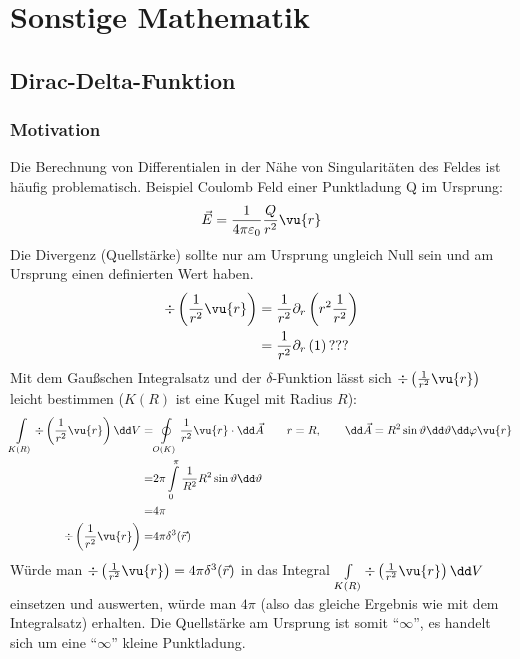 \chapter{Sonstige Mathematik}
 \section{Dirac-Delta-Funktion}
  \subsection{Motivation}
	  Die Berechnung von Differentialen in der Nähe von Singularitäten des Feldes
	  ist häufig problematisch. Beispiel Coulomb Feld einer Punktladung Q im Ursprung:
	  \begin{equation}
		  \begin{split}
			  \vec{E}= \frac{1}{4\pi\varepsilon_{0}}\frac{Q}{r^{2}}\vu{r}
		  \end{split}
	  \end{equation}
	  Die Divergenz (Quellstärke) sollte nur am Ursprung ungleich Null sein und am
	  Ursprung einen definierten Wert haben.
	  \begin{equation}
		  \begin{split}
			  \div \left( \frac{1}{r^{2}}\vu{r}\right)&= \frac{1}{r^{2}}\partial_{r} \left
			  ( r^{2} \frac{1}{r^{2}}\right)\\&= \frac{1}{r^{2}}\partial_{r} \left( 1 \right
			  ) \mbox{???}
		  \end{split}
	  \end{equation}
	  Mit dem Gaußschen Integralsatz und der $\delta$-Funktion lässt sich $\div\left(
		  \frac{1}{r^{2}}\vu{r}\right)$ leicht bestimmen ($K(R)$ ist eine Kugel mit Radius $R$):
	  \begin{equation}
		  \begin{split}
			  \int\limits_{K(R)}\div\left(\frac{1}{r^{2}}\vu{r}\right) \dd V =&\oint\limits
			  _{O(K)}\frac{1}{r^{2}}\vu{r}\cdot\dd \vec{A}\qquad r=R, \qquad \dd\vec{A}= R^{2} \sin
			  \vartheta \dd \vartheta \dd \varphi \vu{r}\\ =&2\pi \int\limits_{0}^{\pi} \frac{1}{R^{2}}
			  R^{2} \sin\vartheta \dd \vartheta \\ =&4\pi \\ \div\left(\frac{1}{r^{2}}\vu
			  {r}\right) =&4\pi\delta^{3}(\vec{r})
		  \end{split}
	  \end{equation}
	  Würde man $\div\left(\frac{1}{r^{2}}\vu{r}\right) =4\pi\delta^{3}(\vec{r})$ in das Integral $\int\limits_{K(R)}\div\left(\frac{1}{r^{2}}\vu{r}\right) \dd V$ einsetzen und auswerten, würde man $4\pi$ (also das gleiche Ergebnis wie mit dem Integralsatz) erhalten. Die Quellstärke am Ursprung ist somit \enquote{$\infty$}, es handelt sich um eine \enquote{$\infty$} kleine Punktladung.\\
